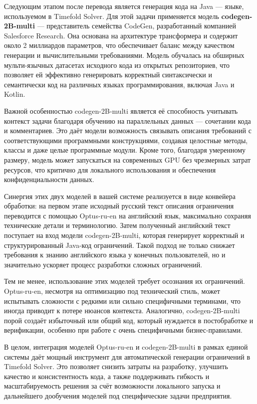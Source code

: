 Следующим этапом после перевода является генерация кода на Java — языке, используемом в Timefold Solver. Для этой задачи применяется модель \textbf{codegen-2B-multi} — представитель семейства CodeGen, разработанный компанией Salesforce Research. Она основана на архитектуре трансформера и содержит около 2 миллиардов параметров, что обеспечивает баланс между качеством генерации и вычислительными требованиями. Модель обучалась на обширных мульти-язычных датасетах исходного кода из открытых репозиториев, что позволяет ей эффективно генерировать корректный синтаксически и семантически код на различных языках программирования, включая Java и Kotlin.

Важной особенностью codegen-2B-multi является её способность учитывать контекст задачи благодаря обучению на параллельных данных — сочетании кода и комментариев. Это даёт модели возможность связывать описания требований с соответствующими программными конструкциями, создавая целостные методы, классы и даже целые программные модули. Кроме того, благодаря умеренному размеру, модель может запускаться на современных GPU без чрезмерных затрат ресурсов, что критично для локального использования и обеспечения конфиденциальности данных.

Синергия этих двух моделей в вашей системе реализуется в виде конвейера обработки: на первом этапе исходный русский текст описания ограничения переводится с помощью Optus-ru-en на английский язык, максимально сохраняя технические детали и терминологию. Затем полученный английский текст поступает на вход модели codegen-2B-multi, которая генерирует корректный и структурированный Java-код ограничений. Такой подход не только снижает требования к знанию английского языка у конечных пользователей, но и значительно ускоряет процесс разработки сложных ограничений.

Тем не менее, использование этих моделей требует осознания их ограничений. Optus-ru-en, несмотря на оптимизацию под технический стиль, может испытывать сложности с редкими или сильно специфичными терминами, что иногда приводит к потере нюансов контекста. Аналогично, codegen-2B-multi порой создаёт избыточный или общий код, который нуждается в постобработке и верификации, особенно при работе с очень специфичными бизнес-правилами.

В целом, интеграция моделей Optus-ru-en и codegen-2B-multi в рамках единой системы даёт мощный инструмент для автоматической генерации ограничений в Timefold Solver. Это позволяет снизить затраты на разработку, улучшить качество и консистентность кода, а также поддерживать гибкость и масштабируемость решения за счёт возможности локального запуска и дальнейшего дообучения моделей под специфические задачи предприятия.

